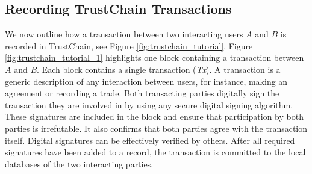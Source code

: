 \subsection{Recording TrustChain Transactions}
We now outline how a transaction between two interacting users $ A $ and $ B $ is recorded in TrustChain, see Figure \ref{fig:trustchain_tutorial}.
Figure \ref{fig:trustchain_tutorial_1} highlights one block containing a transaction between $ A $ and $ B $.
Each block contains a single transaction (\emph{Tx}).
A transaction is a generic description of any interaction between users, for instance, making an agreement or recording a trade.
Both transacting parties digitally sign the transaction they are involved in by using any secure digital signing algorithm.
These signatures are included in the block and ensure that participation by both parties is irrefutable.
It also confirms that both parties agree with the transaction itself.
Digital signatures can be effectively verified by others.
After all required signatures have been added to a record, the transaction is committed to the local databases of the two interacting parties.

